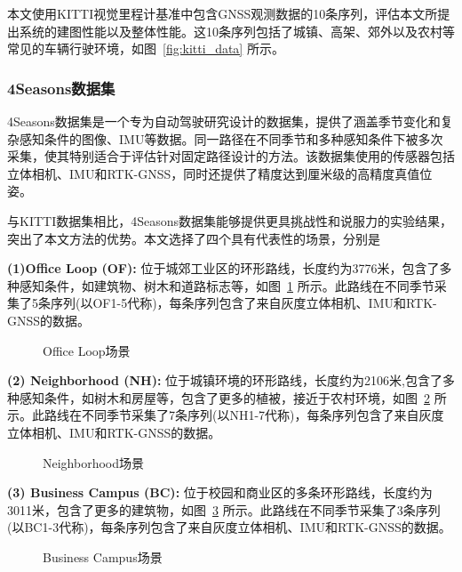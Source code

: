 本文使用KITTI视觉里程计基准中包含GNSS观测数据的10条序列，评估本文所提出系统的建图性能以及整体性能。这10条序列包括了城镇、高架、郊外以及农村等常见的车辆行驶环境，如图~\ref{fig:kitti_data} 所示。

\subsubsection{4Seasons数据集}
4Seasons数据集\cite{wenzel20214seasons}是一个专为自动驾驶研究设计的数据集，提供了涵盖季节变化和复杂感知条件的图像、IMU等数据。同一路径在不同季节和多种感知条件下被多次采集，使其特别适合于评估针对固定路径设计的方法。该数据集使用的传感器包括立体相机、IMU和RTK-GNSS，同时还提供了精度达到厘米级的高精度真值位姿。

与KITTI数据集相比，4Seasons数据集能够提供更具挑战性和说服力的实验结果，突出了本文方法的优势。本文选择了四个具有代表性的场景，分别是

\textbf{(1)Office Loop (OF):} 位于城郊工业区的环形路线，长度约为3776米，包含了多种感知条件，如建筑物、树木和道路标志等，如图~\ref{fig:OF_data} 所示。此路线在不同季节采集了5条序列(以OF1-5代称)，每条序列包含了来自灰度立体相机、IMU和RTK-GNSS的数据。
\begin{figure}
  \centering
  \caption{Office Loop场景}
  \label{fig:OF_data}
\end{figure}

\textbf{(2) Neighborhood (NH):} 位于城镇环境的环形路线，长度约为2106米,包含了多种感知条件，如树木和房屋等，包含了更多的植被，接近于农村环境，如图~\ref{fig:NH_data} 所示。此路线在不同季节采集了7条序列(以NH1-7代称)，每条序列包含了来自灰度立体相机、IMU和RTK-GNSS的数据。

\begin{figure}
  \centering
  \caption{Neighborhood场景}
  \label{fig:NH_data}
\end{figure}

\textbf{(3) Business Campus (BC):} 位于校园和商业区的多条环形路线，长度约为3011米，包含了更多的建筑物，如图~\ref{fig:BC_data} 所示。此路线在不同季节采集了3条序列(以BC1-3代称)，每条序列包含了来自灰度立体相机、IMU和RTK-GNSS的数据。

\begin{figure}
  \centering
  \caption{Business Campus场景}
  \label{fig:BC_data}
\end{figure}


